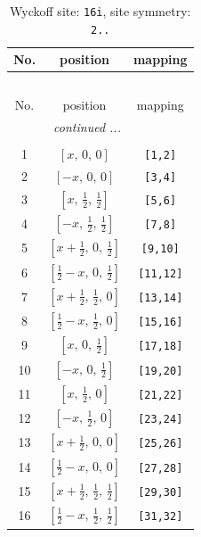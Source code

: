 \documentclass[fleqn,8pt]{jsarticle}
\begin{document}
\begin{longtable}{ccc}
\caption{Wyckoff site: {\tt 16i}, site symmetry: {\tt 2..}}
 \\
 \hline \hline
No. & position & mapping \\ \hline \endfirsthead

\multicolumn{2}{l}{\tablename\ \thetable{}} \\
 \hline \hline
No. & position & mapping \\ \hline \endhead

 \hline \hline
\multicolumn{2}{r}{\footnotesize\it continued ...} \\ \endfoot

 \hline \hline
\multicolumn{2}{r}{} \\ \endlastfoot

1 & $\left[ x,\, 0,\, 0 \right]$ & {\tt [1,2]} \\ \hline
2 & $\left[ - x,\, 0,\, 0 \right]$ & {\tt [3,4]} \\ \hline
3 & $\left[ x,\, \frac{1}{2},\, \frac{1}{2} \right]$ & {\tt [5,6]} \\ \hline
4 & $\left[ - x,\, \frac{1}{2},\, \frac{1}{2} \right]$ & {\tt [7,8]} \\ \hline
5 & $\left[ x + \frac{1}{2},\, 0,\, \frac{1}{2} \right]$ & {\tt [9,10]} \\ \hline
6 & $\left[ \frac{1}{2} - x,\, 0,\, \frac{1}{2} \right]$ & {\tt [11,12]} \\ \hline
7 & $\left[ x + \frac{1}{2},\, \frac{1}{2},\, 0 \right]$ & {\tt [13,14]} \\ \hline
8 & $\left[ \frac{1}{2} - x,\, \frac{1}{2},\, 0 \right]$ & {\tt [15,16]} \\ \hline
9 & $\left[ x,\, 0,\, \frac{1}{2} \right]$ & {\tt [17,18]} \\ \hline
10 & $\left[ - x,\, 0,\, \frac{1}{2} \right]$ & {\tt [19,20]} \\ \hline
11 & $\left[ x,\, \frac{1}{2},\, 0 \right]$ & {\tt [21,22]} \\ \hline
12 & $\left[ - x,\, \frac{1}{2},\, 0 \right]$ & {\tt [23,24]} \\ \hline
13 & $\left[ x + \frac{1}{2},\, 0,\, 0 \right]$ & {\tt [25,26]} \\ \hline
14 & $\left[ \frac{1}{2} - x,\, 0,\, 0 \right]$ & {\tt [27,28]} \\ \hline
15 & $\left[ x + \frac{1}{2},\, \frac{1}{2},\, \frac{1}{2} \right]$ & {\tt [29,30]} \\ \hline
16 & $\left[ \frac{1}{2} - x,\, \frac{1}{2},\, \frac{1}{2} \right]$ & {\tt [31,32]} \\
\end{longtable}
\end{document}
